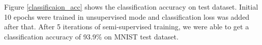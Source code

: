 \documentclass{bmvc2k}
\begin{document}

Figure \ref{classificaion_acc} shows the  classification accuracy on test dataset.
Initial 10 epochs were trained in unsupervised mode and classification loss was added after that.
After 5 iterations of semi-supervised training, we were able to get a classification accuracy of 93.9\% on MNIST test dataset.
\end{document}
